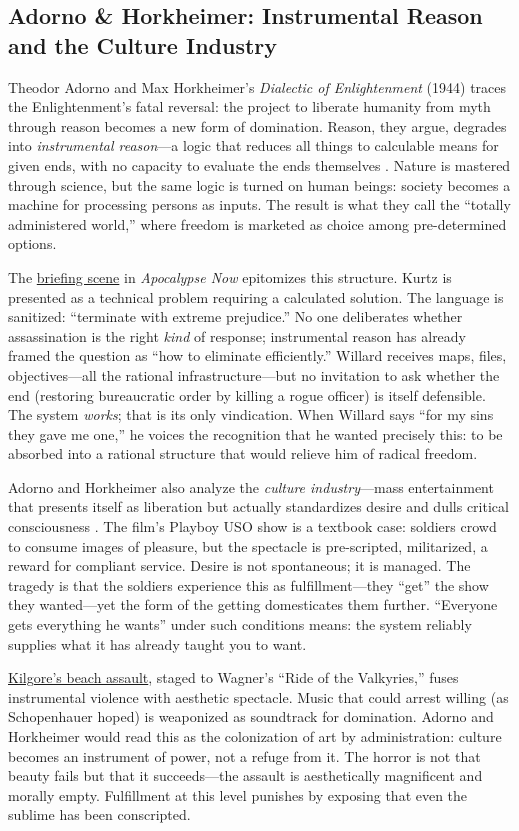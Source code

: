 \subsection*{Adorno \& Horkheimer: Instrumental Reason and the Culture Industry}
\label{ssec:v-adorno-horkheimer}
Theodor Adorno and Max Horkheimer's \textit{Dialectic of Enlightenment} (1944) traces the
Enlightenment's fatal reversal: the project to liberate humanity from myth through reason
becomes a new form of domination. Reason, they argue, degrades into \emph{instrumental
	reason}---a logic that reduces all things to calculable means for given ends, with no capacity
to evaluate the ends themselves \parencite{AdornoHorkheimer2002}. Nature is mastered through
science, but the same logic is turned on human beings: society becomes a machine for
processing persons as inputs. The result is what they call the ``totally administered world,''
where freedom is marketed as choice among pre-determined options.

The \hyperref[scene:briefing]{briefing scene} in \textit{Apocalypse Now} epitomizes this
structure. Kurtz is presented as a technical problem requiring a calculated solution. The
language is sanitized: ``terminate with extreme prejudice.'' No one deliberates whether
assassination is the right \emph{kind} of
response; instrumental reason has already framed the question as ``how to eliminate
efficiently.'' Willard receives maps, files, objectives---all the rational infrastructure---but
no invitation to ask whether the end (restoring bureaucratic order by killing a rogue officer)
is itself defensible. The system \emph{works}; that is its only vindication. When Willard says
``for my sins they gave me one,'' he voices the recognition that he wanted precisely this: to
be absorbed into a rational structure that would relieve him of radical freedom.

Adorno and Horkheimer also analyze the \emph{culture industry}---mass entertainment that
presents itself as liberation but actually standardizes desire and dulls critical consciousness
\parencite{AdornoHorkheimer2002}. The film's Playboy USO show is a textbook case: soldiers
crowd to consume images of pleasure, but the spectacle is pre-scripted, militarized, a reward
for compliant service. Desire is not spontaneous; it is managed. The tragedy is that the
soldiers experience this as fulfillment---they ``get'' the show they wanted---yet the form of
the getting domesticates them further. ``Everyone gets everything he wants'' under such
conditions means: the system reliably supplies what it has already taught you to want.

\hyperref[scene:kilgore-beach]{Kilgore's beach assault}, staged to Wagner's ``Ride of the
Valkyries,'' fuses instrumental violence with aesthetic spectacle. Music that could arrest
willing (as Schopenhauer hoped) is weaponized as soundtrack for domination. Adorno and
Horkheimer would read this as the colonization of art by administration: culture becomes an
instrument of power, not a refuge
from it. The horror is not that beauty fails but that it succeeds---the assault is
aesthetically magnificent and morally empty. Fulfillment at this level punishes by exposing
that even the sublime has been conscripted.
